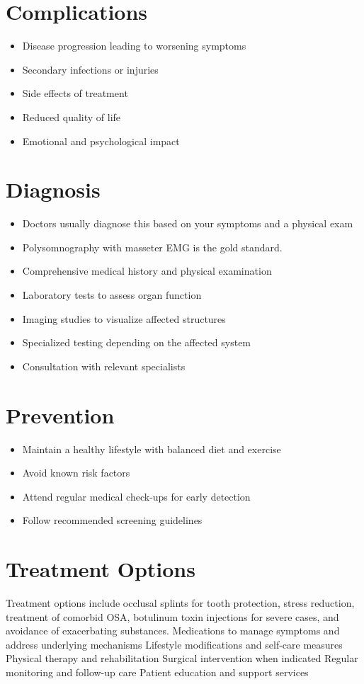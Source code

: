 \section{Complications}
\begin{itemize}[noitemsep]
  \item Disease progression leading to worsening symptoms
  \item Secondary infections or injuries
  \item Side effects of treatment
  \item Reduced quality of life
  \item Emotional and psychological impact
\end{itemize}
\section{Diagnosis}
\begin{itemize}[noitemsep]
  \item Doctors usually diagnose this based on your symptoms and a physical exam
  \item Polysomnography with masseter EMG is the gold standard.
  \item Comprehensive medical history and physical examination
  \item Laboratory tests to assess organ function
  \item Imaging studies to visualize affected structures
  \item Specialized testing depending on the affected system
  \item Consultation with relevant specialists
\end{itemize}
\section{Prevention}
\begin{itemize}[noitemsep]
  \item Maintain a healthy lifestyle with balanced diet and exercise
  \item Avoid known risk factors
  \item Attend regular medical check-ups for early detection
  \item Follow recommended screening guidelines
\end{itemize}
\section{Treatment Options}
Treatment options include occlusal splints for tooth protection, stress reduction, treatment of comorbid OSA, botulinum toxin injections for severe cases, and avoidance of exacerbating substances. Medications to manage symptoms and address underlying mechanisms Lifestyle modifications and self-care measures Physical therapy and rehabilitation Surgical intervention when indicated Regular monitoring and follow-up care Patient education and support services

